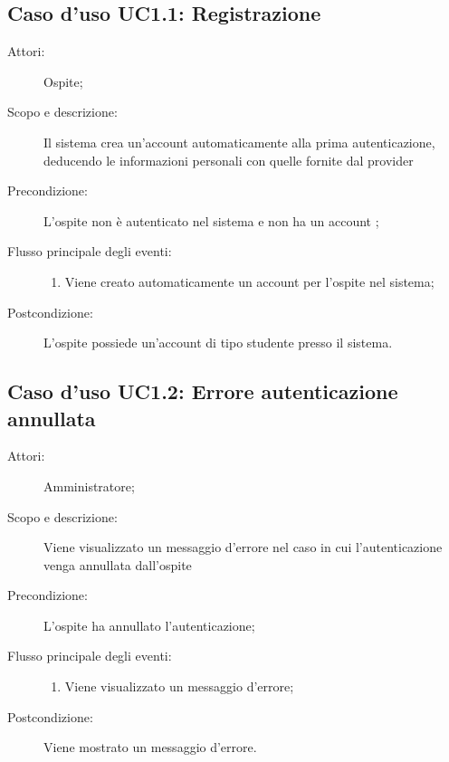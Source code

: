\subsection{Caso d'uso UC1.1: Registrazione}\begin{description}
\item[Attori:] Ospite;
\item[Scopo e descrizione:] Il sistema crea un'account automaticamente alla prima autenticazione, deducendo le informazioni personali con quelle fornite dal provider 
      \item[Precondizione:] L'ospite non è autenticato nel sistema e non ha un account ;

        \item[Flusso principale degli eventi:] \begin{enumerate}
          \item Viene creato automaticamente un account per l'ospite nel sistema;

      \end{enumerate}
    \item[Postcondizione:] L’ospite possiede un’account di tipo studente presso il sistema.
  \end{description}
\hypertarget{UC1.2}{}
\subsection{Caso d'uso UC1.2: Errore autenticazione annullata}\begin{description}
\item[Attori:] Amministratore;
\item[Scopo e descrizione:] Viene visualizzato un messaggio d'errore nel caso in cui l'autenticazione venga annullata dall'ospite
      \item[Precondizione:] L'ospite ha annullato l'autenticazione;

        \item[Flusso principale degli eventi:] \begin{enumerate}
          \item Viene visualizzato un messaggio d'errore;

      \end{enumerate}
    \item[Postcondizione:] Viene mostrato un messaggio d'errore.
  \end{description}
\hypertarget{UC2}{}
